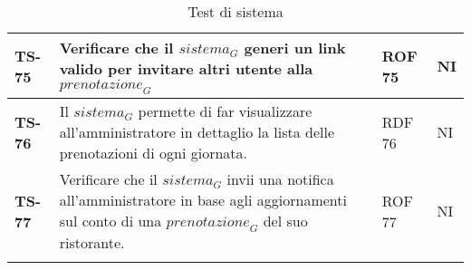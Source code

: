 \begin{longtable}{|>{\centering\arraybackslash}p{1.5cm}|p{12cm}|p{2cm}|p{1cm}|}
  \hline
  \rowcolor{gray!10}
  \textbf{TS-75} & Verificare che il $\textit{sistema}_G$ generi un link valido per invitare altri utente alla $\textit{prenotazione}_G$ & ROF 75 & NI \\
  \hline
  \rowcolor{gray!10}
  \textbf{TS-76} &  Il $\textit{sistema}_G$ permette di far visualizzare all’amministratore in dettaglio la lista
delle prenotazioni di ogni giornata. & RDF 76 & NI \\
  \hline
  \rowcolor{gray!10}
  \textbf{TS-77} & Verificare che il $\textit{sistema}_G$ invii una notifica all’amministratore in base agli aggiornamenti sul conto di una $\textit{prenotazione}_G$ del suo ristorante. & ROF 77 & NI \\
  \hline
  
  \caption{Test di sistema} 
  \label{tab:test_sistema}
  \end{longtable}
\setlength{\extrarowheight}{8pt}
